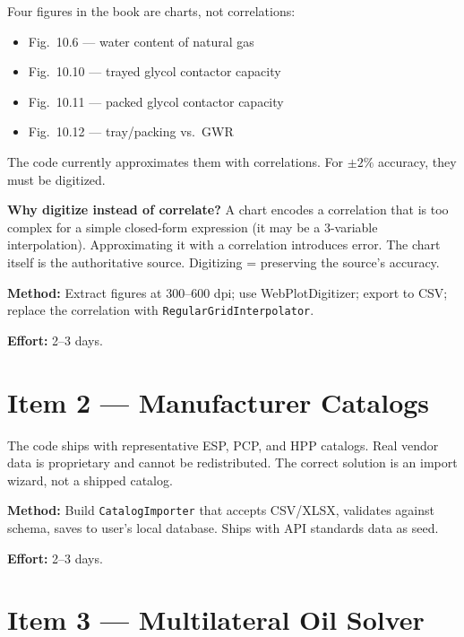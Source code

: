 \documentclass[11pt,a4paper,openany]{book}
\newcommand{\code}[1]{\texttt{#1}}
\begin{document}
\begin{purpose}
Four figures in the book are charts, not correlations:
\begin{itemize}
  \item Fig.~10.6 — water content of natural gas
  \item Fig.~10.10 — trayed glycol contactor capacity
  \item Fig.~10.11 — packed glycol contactor capacity
  \item Fig.~10.12 — tray/packing vs.\ GWR
\end{itemize}
The code currently approximates them with correlations. For $\pm 2\%$
accuracy, they must be digitized.
\end{purpose}

\begin{theory}
\textbf{Why digitize instead of correlate?} A chart encodes a
correlation that is too complex for a simple closed-form expression
(it may be a 3-variable interpolation). Approximating it with a
correlation introduces error. The chart itself is the authoritative
source. Digitizing = preserving the source's accuracy.
\end{theory}

\textbf{Method:} Extract figures at 300--600 dpi; use WebPlotDigitizer;
export to CSV; replace the correlation with \code{RegularGridInterpolator}.

\textbf{Effort:} 2--3 days.

\section{Item 2 — Manufacturer Catalogs}

\begin{purpose}
The code ships with representative ESP, PCP, and HPP catalogs. Real
vendor data is proprietary and cannot be redistributed. The correct
solution is an import wizard, not a shipped catalog.
\end{purpose}

\textbf{Method:} Build \code{CatalogImporter} that accepts CSV/XLSX,
validates against schema, saves to user's local database. Ships with
API standards data as seed.

\textbf{Effort:} 2--3 days.

\section{Item 3 — Multilateral Oil Solver}
\end{document}
